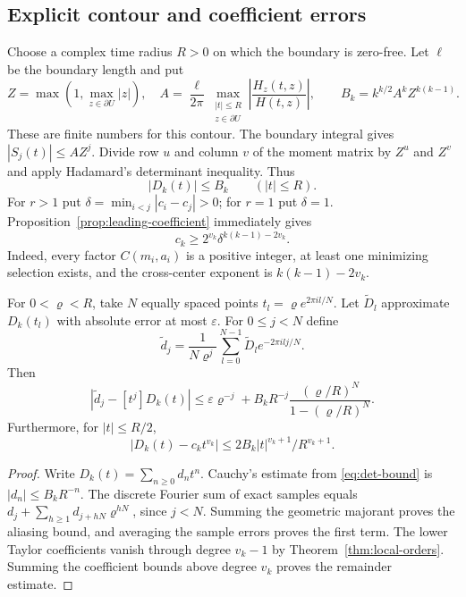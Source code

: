 \subsection{Explicit contour and coefficient errors}
Choose a complex time radius $R>0$ on which the boundary is zero-free. Let $\ell$ be the boundary length and put
\[
 Z=\max(1,\max_{z\in\partial U}|z|),\quad
 A=\frac{\ell}{2\pi}\max_{\substack{|t|\le R\\z\in\partial U}}
       \left|\frac{H_z(t,z)}{H(t,z)}\right|,
 \qquad B_k=k^{k/2}A^kZ^{k(k-1)}.
\]
These are finite numbers for this contour. The boundary integral gives $|S_j(t)|\le AZ^j$. Divide row $u$ and column $v$ of the moment matrix by $Z^u$ and $Z^v$ and apply Hadamard's determinant inequality. Thus
\begin{equation}\label{eq:det-bound}
 |D_k(t)|\le B_k\qquad(|t|\le R).
\end{equation}
For $r>1$ put $\delta=\min_{i<j}|c_i-c_j|>0$; for $r=1$ put $\delta=1$. Proposition~\ref{prop:leading-coefficient} immediately gives
\begin{equation}\label{eq:lead-lower}
 c_k\ge 2^{v_k}\delta^{k(k-1)-2v_k}.
\end{equation}
Indeed, every factor $C(m_i,a_i)$ is a positive integer, at least one minimizing selection exists, and the cross-center exponent is $k(k-1)-2v_k$.

\begin{proposition}\label{prop:coefficient-certificate}
For $0<\varrho<R$, take $N$ equally spaced points $t_l=\varrho e^{2\pi il/N}$. Let $\widetilde D_l$ approximate $D_k(t_l)$ with absolute error at most $\varepsilon$. For $0\le j<N$ define
\[
 \widetilde d_j=\frac1{N\varrho^j}\sum_{l=0}^{N-1}
           \widetilde D_l e^{-2\pi ilj/N}.
\]
Then
\[
 |\widetilde d_j-[t^j]D_k(t)|
 \le \varepsilon\varrho^{-j}
   +B_kR^{-j}\frac{(\varrho/R)^N}{1-(\varrho/R)^N}.
\]
Furthermore, for $|t|\le R/2$,
\[
 |D_k(t)-c_kt^{v_k}|
 \le 2B_k|t|^{v_k+1}/R^{v_k+1}.
\]
\end{proposition}
\begin{proof}
Write $D_k(t)=\sum_{n\ge0}d_nt^n$. Cauchy's estimate from \eqref{eq:det-bound} is $|d_n|\le B_kR^{-n}$. The discrete Fourier sum of exact samples equals $d_j+\sum_{h\ge1}d_{j+hN}\varrho^{hN}$, since $j<N$. Summing the geometric majorant proves the aliasing bound, and averaging the sample errors proves the first term. The lower Taylor coefficients vanish through degree $v_k-1$ by Theorem~\ref{thm:local-orders}. Summing the coefficient bounds above degree $v_k$ proves the remainder estimate.
\end{proof}

